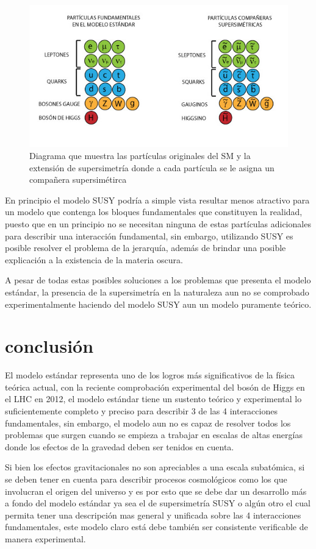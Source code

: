 \documentclass[journal]{IEEEtran}
\begin{document}
\begin{figure}[!htb]
\centering
\includegraphics[width=\linewidth,height=6 cm]{Supersimetria.jpg}
\caption{Diagrama que  muestra las partículas originales del SM y la extensión de supersimetría donde a cada partícula se le asigna un compañera supersimétirca}
\label{SUSY}
\end{figure}


En principio el modelo SUSY podría a simple vista resultar menos atractivo para un modelo que contenga los bloques fundamentales que constituyen la realidad, puesto que en un principio no se necesitan ninguna de estas partículas adicionales para describir una interacción fundamental, sin embargo, utilizando SUSY es posible resolver el problema de la jerarquía, además de brindar una posible explicación a la existencia de la materia oscura.

A pesar de todas estas posibles soluciones a los problemas que presenta el modelo estándar, la presencia de la supersimetría en la naturaleza aun no se comprobado experimentalmente haciendo del modelo SUSY aun un modelo puramente teórico. 



\section{conclusión}

El modelo estándar representa uno de los logros más significativos de la física teórica actual, con la reciente comprobación experimental del bosón de Higgs en el LHC en 2012, el modelo estándar tiene un sustento teórico y experimental lo suficientemente completo y preciso para describir 3 de las 4 interacciones fundamentales, sin embargo, el modelo aun no es capaz de resolver todos los problemas que surgen cuando se empieza a trabajar en escalas de altas energías donde los efectos de la gravedad deben ser tenidos en cuenta.

Si bien los efectos gravitacionales no son apreciables a una escala subatómica, si se deben tener en cuenta para describir procesos cosmológicos como los que involucran el origen del universo y es por esto que se debe dar un desarrollo más a fondo del modelo estándar ya sea el de supersimetría SUSY o algún otro el cual permita tener una descripción mas general y unificada sobre las 4 interacciones fundamentales, este modelo claro está debe también ser consistente verificable de manera experimental.
\end{document}
